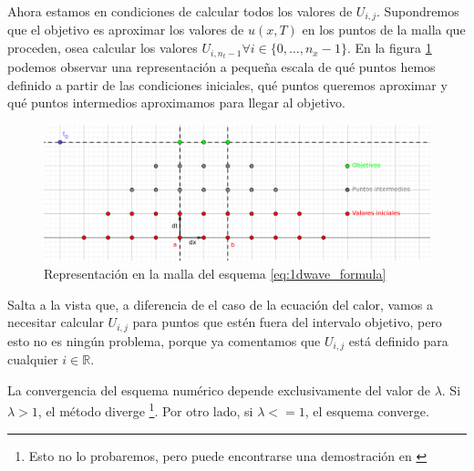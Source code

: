 Ahora estamos en condiciones de calcular todos los valores de $U_{i,j}$. Supondremos que el objetivo es aproximar los valores de $u(x,T)$ en los puntos de la malla que proceden, osea calcular los valores $U_{i,n_t-1} \forall i\in \{0,\dots,n_x-1\}$. En la figura \ref{fig:1dwave_points} podemos observar una representación a pequeña escala de qué puntos hemos definido a partir de las condiciones iniciales, qué puntos queremos aproximar y qué puntos intermedios aproximamos para llegar al objetivo.
\begin{figure}[h]
	\centering
	\includegraphics[width=\linewidth]{./Imagenes/Bitmap/1dwavepoints.png}
	\caption{Representación en la malla del esquema \eqref{eq:1dwave_formula}}
	\label{fig:1dwave_points}
\end{figure}

Salta a la vista que, a diferencia de el caso de la ecuación del calor, vamos a necesitar calcular $U_{i,j}$ para puntos que estén fuera del intervalo objetivo, pero esto no es ningún problema, porque ya comentamos que $U_{i,j}$ está definido para cualquier $i\in\mathbb{R}$.

La convergencia del esquema numérico depende exclusivamente del valor de $\lambda$. Si $\lambda > 1$, el método diverge 
\footnote{Esto no lo probaremos, pero puede encontrarse una demostración en \cite[ p. 487.]{anummeth}}. Por otro lado, si $\lambda <=1$, el esquema converge.

